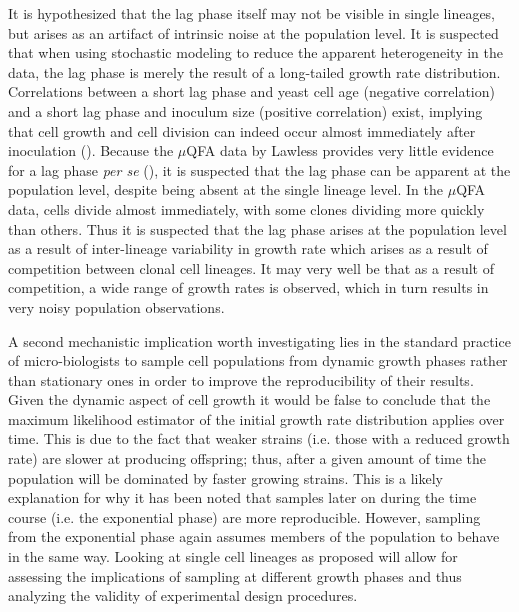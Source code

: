 \documentclass{bioinfo}
\begin{document}
It is hypothesized that the lag phase itself may not be visible in single lineages, but arises as an artifact of intrinsic noise at the population level. It is suspected that when using stochastic modeling to reduce the apparent heterogeneity in the data, the lag phase is merely the result of a long-tailed growth rate distribution. Correlations between a short lag phase and yeast cell age (negative correlation) and a short lag phase and inoculum size (positive correlation) exist, implying that cell growth and cell division can indeed occur almost immediately after inoculation (\citealp{Ginovart11}). Because the  $\mu$QFA data by Lawless provides very little evidence for a lag phase \textit{per se} (\citealp{Lawless13}), it is suspected that the lag phase can be apparent at the population level, despite being absent at the single lineage level. In the $\mu$QFA data, cells divide almost immediately, with some clones dividing more quickly than others. Thus it is suspected that the lag phase arises at the population level as a result of inter-lineage variability in growth rate which arises as a result of competition between clonal cell lineages. It may very well be that as a result of competition, a wide range of growth rates is observed, which in turn results in very noisy population observations. 

A second mechanistic implication worth investigating lies in the standard practice of micro-biologists to sample cell populations from dynamic growth phases rather than stationary ones in order to improve the reproducibility of their results. Given the dynamic aspect of cell growth it would be false to conclude that the maximum likelihood estimator of the initial growth rate distribution applies over time. This is due to the fact that weaker strains (i.e. those with a reduced growth rate) are slower at producing offspring; thus, after a given amount of time the population will be dominated by faster growing strains. This is a likely explanation for why it has been noted that samples later on during the time course (i.e. the exponential phase) are more reproducible. However, sampling from the exponential phase again assumes members of the population to behave in the same way. Looking at single cell lineages as proposed will allow for assessing the implications of sampling at different growth phases and thus analyzing the validity of experimental design procedures. 
\end{document}
